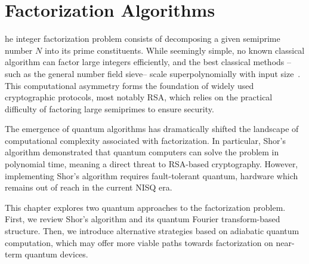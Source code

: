 \chapter{Factorization Algorithms}
\label{Chapter:Factorization}

he integer factorization problem consists of
decomposing a given semiprime number $N$ into its prime constituents. While seemingly simple,
no known classical algorithm can factor large integers efficiently, and the best classical
methods --such as the general number field sieve-- scale superpolynomially with input
size~\cite{montgomery_cwi_1994}. This computational asymmetry forms the foundation of widely
used cryptographic protocols, most notably RSA, which relies on the practical difficulty of
factoring large semiprimes to ensure security.

The emergence of quantum algorithms has dramatically shifted the landscape of computational
complexity associated with factorization. In particular, Shor's algorithm demonstrated that
quantum computers can solve the problem in polynomial time, meaning a direct threat to
RSA-based cryptography. However, implementing Shor's algorithm requires fault-tolerant quantum,
hardware which remains out of reach in the current NISQ era.


This chapter explores two quantum approaches to the factorization problem. First, we review
Shor's algorithm and its quantum Fourier transform-based structure. Then, we introduce
alternative strategies based on adiabatic quantum computation, which may offer more viable paths
towards factorization on near-term quantum devices.